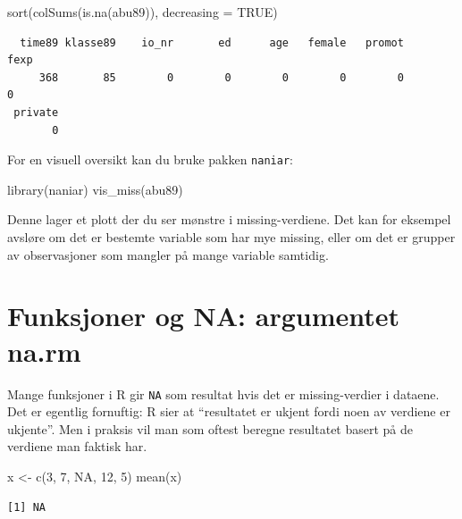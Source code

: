 \documentclass[
  norsk,
  letterpaper,
  DIV=11,
  numbers=noendperiod]{scrreprt}
\newenvironment{Shaded}{\begin{snugshade}}{\end{snugshade}}
\newcommand{\AttributeTok}[1]{\textcolor[rgb]{0.40,0.45,0.13}{#1}}
\newcommand{\ConstantTok}[1]{\textcolor[rgb]{0.56,0.35,0.01}{#1}}
\newcommand{\DecValTok}[1]{\textcolor[rgb]{0.68,0.00,0.00}{#1}}
\newcommand{\FunctionTok}[1]{\textcolor[rgb]{0.28,0.35,0.67}{#1}}
\newcommand{\NormalTok}[1]{\textcolor[rgb]{0.00,0.23,0.31}{#1}}
\newcommand{\OtherTok}[1]{\textcolor[rgb]{0.00,0.23,0.31}{#1}}
\theoremstyle{definition}
\theoremstyle{remark}
\begin{document}
\begin{Shaded}
\begin{Highlighting}[]
\FunctionTok{sort}\NormalTok{(}\FunctionTok{colSums}\NormalTok{(}\FunctionTok{is.na}\NormalTok{(abu89)), }\AttributeTok{decreasing =} \ConstantTok{TRUE}\NormalTok{)}
\end{Highlighting}
\end{Shaded}

\begin{verbatim}
  time89 klasse89    io_nr       ed      age   female   promot     fexp 
     368       85        0        0        0        0        0        0 
 private 
       0 
\end{verbatim}

For en visuell oversikt kan du bruke pakken \texttt{naniar}:

\begin{Shaded}
\begin{Highlighting}[]
\FunctionTok{library}\NormalTok{(naniar)}
\FunctionTok{vis\_miss}\NormalTok{(abu89)}
\end{Highlighting}
\end{Shaded}

Denne lager et plott der du ser mønstre i missing-verdiene. Det kan for
eksempel avsløre om det er bestemte variable som har mye missing, eller
om det er grupper av observasjoner som mangler på mange variable
samtidig.

\section{Funksjoner og NA: argumentet
na.rm}\label{funksjoner-og-na-argumentet-na.rm}

Mange funksjoner i R gir \texttt{NA} som resultat hvis det er
missing-verdier i dataene. Det er egentlig fornuftig: R sier at
``resultatet er ukjent fordi noen av verdiene er ukjente''. Men i
praksis vil man som oftest beregne resultatet basert på de verdiene man
faktisk har.

\begin{Shaded}
\begin{Highlighting}[]
\NormalTok{x }\OtherTok{\textless{}{-}} \FunctionTok{c}\NormalTok{(}\DecValTok{3}\NormalTok{, }\DecValTok{7}\NormalTok{, }\ConstantTok{NA}\NormalTok{, }\DecValTok{12}\NormalTok{, }\DecValTok{5}\NormalTok{)}
\FunctionTok{mean}\NormalTok{(x)}
\end{Highlighting}
\end{Shaded}

\begin{verbatim}
[1] NA
\end{verbatim}
\end{document}
